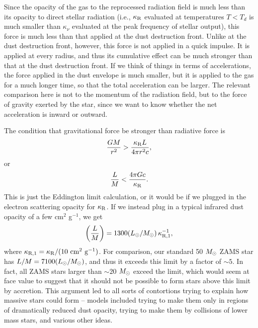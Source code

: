 Since the opacity of the gas to the reprocessed radiation field is much less than its opacity to direct stellar radiation (i.e., $\kappa_{\rm R}$ evaluated at temperatures $T<T_d$ is much smaller than $\kappa_{\nu}$ evaluated at the peak frequency of stellar output), this force is much less than that applied at the dust destruction front. Unlike at the dust destruction front, however, this force is not applied in a quick impulse. It is applied at every radius, and thus its cumulative effect can be much stronger than that at the dust destruction front. If we think of things in terms of accelerations, the force applied in the dust envelope is much smaller, but it is applied to the gas for a much longer time, so that the total acceleration can be larger. The relevant comparison here is not to the momentum of the radiation field, but to the force of gravity exerted by the star, since we want to know whether the net acceleration is inward or outward.

The condition that gravitational force be stronger than radiative force is
\begin{equation}
\frac{G M}{r^2} > \frac{\kappa_{\rm R} L}{4\pi r^2 c},
\end{equation}
or
\begin{equation}
\frac{L}{M} < \frac{4\pi G c}{\kappa_{\rm R}}.
\end{equation}
This is just the Eddington limit calculation, or it would be if we plugged in the electron scattering opacity for $\kappa_{\rm R}$.
If we instead plug in a typical infrared dust opacity of a few cm$^2$ g$^{-1}$, we get
\begin{equation}
\left(\frac{L}{M}\right) = 1300 (L_{\odot}/M_{\odot}) \,\kappa_{\rm R,1}^{-1},
\end{equation}
where $\kappa_{\rm R,1} = \kappa_{\rm R}/(10\mbox{ cm}^2\mbox{ g}^{-1})$.
For comparison, our standard 50 $M_{\odot}$ ZAMS star has $L/M= 7100 (L_{\odot}/M_{\odot})$, and thus it exceeds this limit by a factor of $\sim 5$. In fact, all ZAMS stars larger than $\sim 20$ $M_{\odot}$ exceed the limit, which would seem at face value to suggest that it should not be possible to form stars above this limit by accretion. This argument led to all sorts of contortions trying to explain how massive stars could form -- models included trying to make them only in regions of dramatically reduced dust opacity, trying to make them by collisions of lower mass stars, and various other ideas.


